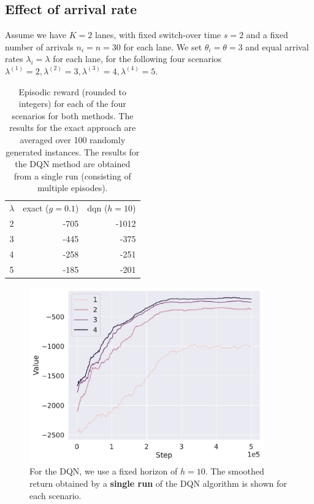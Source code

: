 \documentclass{article}
\theoremstyle{definition}
\theoremstyle{plain}
\begin{document}
\subsection{Effect of arrival rate}
%
Assume we have $K=2$ lanes, with fixed switch-over time $s=2$ and a fixed number
of arrivals $n_{i}=n=30$ for each lane. We set $\theta_{i} = \theta = 3$ and
equal arrival rates $\lambda_{i} = \lambda$ for each lane, for the following
four scenarios $\lambda^{(1)} = 2, \lambda^{(2)} = 3, \lambda^{(3)} = 4, \lambda^{(4)} = 5$.

\newpage


\begin{table}
  \centering
\begin{tabular}{|c|r|r|}
  $\lambda$ & exact ($g=0.1$) & dqn ($h=10$) \\
  \cline{1-3}
  2 & -705 & -1012 \\
  3 & -445 & -375 \\
  4 & -258 & -251 \\
  5 & -185 & -201
\end{tabular}
\caption{Episodic reward (rounded to integers) for each of the four scenarios
  for both methods. The results for the exact approach are averaged over 100
  randomly generated instances. The results for the DQN method are obtained from
  a single run (consisting of multiple episodes).}
\end{table}

\begin{figure}
  \centering
  \includegraphics[width=0.9\textwidth]{../single-intersection/comparison.pdf}
  \caption{For the DQN, we use a fixed horizon of $h = 10$. The smoothed return
    obtained by a \textbf{single run} of the DQN algorithm is shown for each
    scenario.}
  \label{fig:dqn-learning-rates}
\end{figure}

% 
% 
\end{document}
